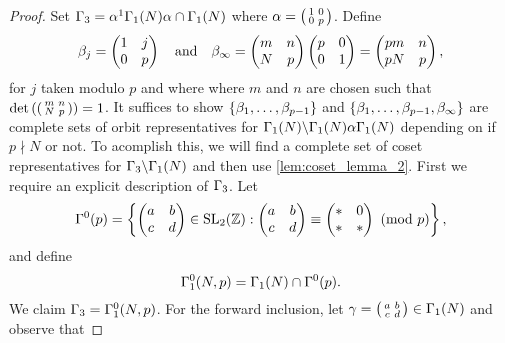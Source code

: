       \begin{proof}
        Set $\Gamma_{3} = \alpha^{1}\Gamma_{1}(N)\alpha \cap \Gamma_{1}(N)$ where $\alpha = \begin{psmallmatrix} 1 & 0 \\ 0 & p \end{psmallmatrix}$. Define
        \[
          \beta_{j} = \begin{pmatrix} 1 & j \\ 0 & p \end{pmatrix} \quad \text{and} \quad \beta_{\infty} = \begin{pmatrix} m & n \\ N & p \end{pmatrix}\begin{pmatrix} p & 0 \\ 0 & 1 \end{pmatrix} = \begin{pmatrix} pm & n \\ pN & p \end{pmatrix},
        \]
        for $j$ taken modulo $p$ and where where $m$ and $n$ are chosen such that $\det\left(\begin{psmallmatrix} m & n \\ N & p \end{psmallmatrix}\right) = 1$. It suffices to show $\{\beta_{1},\ldots,\beta_{p-1}\}$ and $\{\beta_{1},\ldots,\beta_{p-1},\beta_{\infty}\}$ are complete sets of orbit representatives for $\Gamma_{1}(N)\backslash\Gamma_{1}(N)\alpha\Gamma_{1}(N)$ depending on if $p \nmid N$ or not. To acomplish this, we will find a complete set of coset representatives for $\Gamma_{3}\backslash\Gamma_{1}(N)$ and then use \cref{lem:coset_lemma_2}. First we require an explicit description of $\Gamma_{3}$. Let
        \[
          \Gamma^{0}(p) = \left\{\begin{pmatrix} a & b \\ c & d \end{pmatrix} \in \mathrm{SL}_{2}(\mathbb{Z}):\begin{pmatrix} a & b \\ c & d \end{pmatrix} \equiv \begin{pmatrix} \ast & 0 \\ \ast & \ast \end{pmatrix} \ \left(\text{mod }p\right)\right\},
        \]
        and define
        \[
          \Gamma_{1}^{0}(N,p) = \Gamma_{1}(N) \cap \Gamma^{0}(p).
        \]
        We claim $\Gamma_{3} = \Gamma_{1}^{0}(N,p)$. For the forward inclusion, let $\gamma = \begin{psmallmatrix} a & b \\ c & d \end{psmallmatrix} \in \Gamma_{1}(N)$ and observe that

\end{proof}
